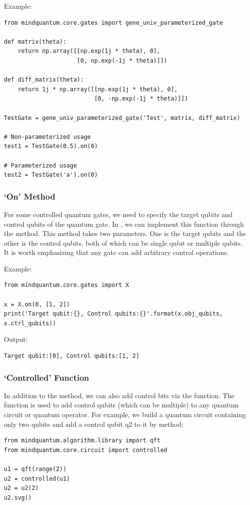 Example:
\begin{lstlisting}
from mindquantum.core.gates import gene_univ_parameterized_gate

def matrix(theta):
    return np.array([[np.exp(1j * theta), 0],
                     [0, np.exp(-1j * theta)]])

def diff_matrix(theta):
    return 1j * np.array([[np.exp(1j * theta), 0],
                          [0, -np.exp(-1j * theta)]])

TestGate = gene_univ_parameterized_gate('Test', matrix, diff_matrix)

# Non-parameterized usage
test1 = TestGate(0.5).on(0)

# Parameterized usage
test2 = TestGate('a').on(0)
\end{lstlisting}

\subsubsection{`On' Method}
For some controlled quantum gates, we need to specify the target qubits and control qubits of the quantum gate. In \MindQuantum, we can implement this function through the  method. This method takes two parameters. One is the target qubits and the other is the control qubits, both of which can be single qubit or multiple qubits. It is worth emphasizing that any gate can add arbitrary control operations.

Example:
\begin{lstlisting}
from mindquantum.core.gates import X

x = X.on(0, [1, 2])
print('Target qubit:{}, Control qubits:{}'.format(x.obj_qubits, x.ctrl_qubits))
\end{lstlisting}

Output:
\begin{lstlisting}
Target qubit:[0], Control qubits:[1, 2]
\end{lstlisting}

\subsubsection{`Controlled' Function}
In addition to the  method, we can also add control bits via the  function. The  function is used to add control qubits (which can be multiple) to any quantum circuit or quantum operator. For example, we build a quantum circuit containing only two qubits and add a control qubit q2 to it by  method:
\begin{lstlisting}
from mindquantum.algorithm.library import qft
from mindquantum.core.circuit import controlled

u1 = qft(range(2))
u2 = controlled(u1)
u2 = u2(2)
u2.svg()
\end{lstlisting}

